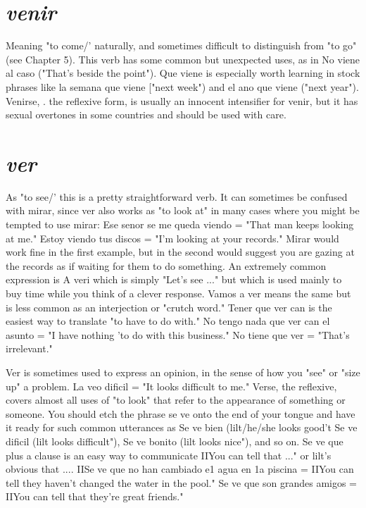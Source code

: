 \documentclass[14pt,a4paper,oneside]{memoir}
\begin{document}
\section{\emph{venir}}

Meaning "to come/' naturally, and sometimes difficult to distinguish from "to go" (see Chapter 5). This verb has some common
but unexpected uses, as in No viene al caso ("That's beside the point").
Que viene is especially worth learning in stock phrases like la semana
que viene ["next week") and el ano que viene ("next year"). Venirse, .
the reflexive form, is usually an innocent intensifier for venir, but it
has sexual overtones in some countries and should be used with care.

\section{\emph{ver}}

As "to see/' this is a pretty straightforward verb. It can sometimes be confused with mirar, since ver also works as "to look at" in
many cases where you might be tempted to use mirar: Ese senor se me
queda viendo = "That man keeps looking at me." Estoy viendo tus
discos = "I'm looking at your records." Mirar would work fine in the
first example, but in the second would suggest you are gazing at the
records as if waiting for them to do something. An extremely common
expression is A veri which is simply "Let's see ..." but which is used
mainly to buy time while you think of a clever response. Vamos a
ver means the same but is less common as an interjection or "crutch
word." Tener que ver can is the easiest way to translate "to have to do
with." No tengo nada que ver can el asunto = "I have nothing 'to do
with this business." No tiene que ver = "That's irrelevant."

Ver is sometimes used to express an opinion, in the sense of
how you "see" or "size up" a problem. La veo dificil = "It looks difficult to me." Verse, the reflexive, covers almost all uses of "to look"
that refer to the appearance of something or someone. You should etch
the phrase se ve onto the end of your tongue and have it ready for such
common utterances as Se ve bien (lilt/he/she looks good't Se ve dificil
(lilt looks difficult"), Se ve bonito (lilt looks nice"), and so on. Se ve que
plus a clause is an easy way to communicate IIYou can tell that ..." or
lilt's obvious that .... IISe ve que no han cambiado e1 agua en 1a piscina = IIYou can tell they haven't changed the water in the pool." Se
ve que son grandes amigos = IIYou can tell that they're great friends."
\end{document}
